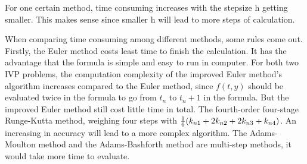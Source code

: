 \documentclass[a4paper]{article}
\begin{document}
    \begin{table}[H]
    \centering
    \caption{Time Consuming  with Different h in IVP2}
    \label{tab:IVP2}
    \end{table}
    
    For one certain method, time consuming increases with the stepsize h getting smaller. This makes sense since smaller h will lead to more steps of calculation.
    
    When comparing time consuming among different methods, some rules come out.
    Firstly, the Euler method costs least time to finish the calculation. It has the advantage that the formula is simple and easy to run in computer. 
    For both two IVP problems, the computation complexity of the improved Euler method’s algorithm increases compared to the Euler method, since $f(t,y)$ should be evaluated twice in the formula to go from $t_n$ to $t_n+1$ in the formula. But the improved Euler method still cost little time in total.
    The fourth-order four-stage Runge-Kutta method, weighing four steps with ${1\over6}(k_{n1}+2k_{n2}+2k_{n3}+k_{n4})$. An increasing in accuracy will lead to a more complex algorithm.
    The Adams-Moulton method and the Adams-Bashforth method are multi-step methods, it would take more time to evaluate.
    
\end{document}
